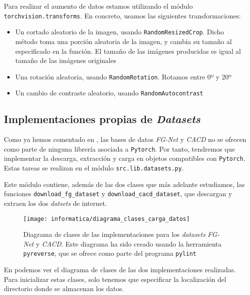Para realizar el aumento de datos estamos utilizando el módulo \lstinline{torchvision.transforms}. En concreto, usamos las siguientes transformaciones:

\begin{itemize}
    \item Un cortado aleatorio de la imagen, usando \lstinline{RandomResizedCrop}. Dicho método toma una porción aleatoria de la imagen, y cambia su tamaño al especificado en la función. El tamaño de las imágenes producidas es igual al tamaño de las imágenes originales
    \item Una rotación aleatoria, usando \lstinline{RandomRotation}. Rotamos entre 0º y 20º
    \item Un cambio de contraste aleatorio, usando \lstinline{RandomAutocontrast}
\end{itemize}

\subsection{Implementaciones propias de \textit{Datasets}} \label{isec:datasets_customs}

Como ya hemos comentado en , las bases de datos \textit{FG-Net} y \textit{CACD} no se ofrecen como parte de ninguna librería asociada a \lstinline{Pytorch}. Por tanto, tendremos que implementar la descarga, extracción y carga en objetos compatibles con \lstinline{Pytorch}. Estas tareas se realizan en el módulo \lstinline{src.lib.datasets.py}.

Este módulo contiene, además de las dos clases que más adelante estudiamos, las funciones \lstinline{download_fg_dataset} y \lstinline{download_cacd_dataset}, que descargan y extraen los dos \textit{datsets} de internet.

\begin{figure}[H]
    \centering
    \texttt{[image: informatica/diagrama\_clases\_carga\_datos]}
    \caption{Diagrama de clases de las implementaciones para los \textit{datasets} \textit{FG-Net} y \textit{CACD}. Este diagrama ha sido creado usando la herramienta \lstinline{pyreverse}, que se ofrece como parte del programa \lstinline{pylint}}
    \label{img:diagrama_clases_datasets}
\end{figure}

En  podemos ver el diagrama de clases de las dos implementaciones realizadas. Para inicializar estas clases, solo tenemos que especificar la localización del directorio donde se almacenan los datos.

